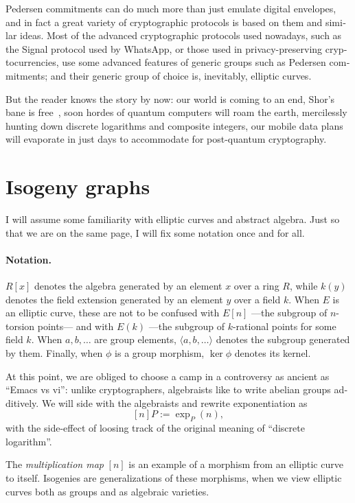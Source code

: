 \begin{otherlanguage}{english}
  Pedersen commitments can do much more than just emulate digital
  envelopes, and in fact a great variety of cryptographic protocols is
  based on them and similar ideas. Most of the advanced cryptographic
  protocols used nowadays, such as the Signal protocol used by
  WhatsApp, or those used in privacy-preserving cryptocurrencies, use
  some advanced features of generic groups such as Pedersen
  commitments; and their generic group of choice is, inevitably,
  elliptic curves.

  But the reader knows the story by now: our world is coming to an
  end, Shor's bane is free~\cite{FOCS:Shor94}, soon hordes of quantum
  computers will roam the earth, mercilessly hunting down discrete
  logarithms and composite integers, our mobile data plans will
  evaporate in just days to accommodate for post-quantum cryptography.

  \section{Isogeny graphs}
  I will assume some familiarity with elliptic curves and abstract
  algebra. Just so that we are on the same page, I will fix some
  notation once and for all.

  \paragraph{Notation.} $R[x]$ denotes the algebra generated by an
  element $x$ over a ring $R$, while $k(y)$ denotes the field
  extension generated by an element $y$ over a field $k$.  When $E$ is
  an elliptic curve, these are not to be confused with $E[n]$ ---the
  subgroup of $n$-torsion points--- and with $E(k)$ ---the subgroup of
  $k$-rational points for some field $k$. When $a,b,\ldots$ are group
  elements, $\langle a,b,\ldots\rangle$ denotes the subgroup generated
  by them. Finally, when $\phi$ is a group morphism, $\ker\phi$
  denotes its kernel.

  At this point, we are obliged to choose a camp in a
  controversy as ancient as ``Emacs vs vi'': unlike cryptographers,
  algebraists like to write abelian groups additively. We will side
  with the algebraists and rewrite exponentiation as
  \[[n]P := \exp_P(n),\] with the side-effect of loosing track of
  the original meaning of ``discrete logarithm''.

  The \emph{multiplication map} $[n]$ is an example of a morphism from
  an elliptic curve to itself.  Isogenies are generalizations of these
  morphisms, when we view elliptic curves both as groups and as
  algebraic varieties.


\end{otherlanguage}
